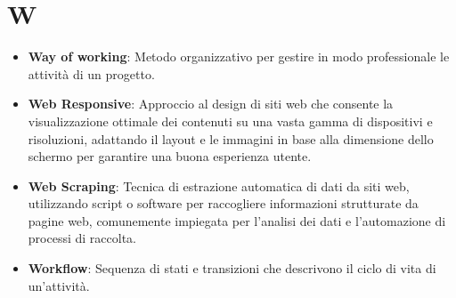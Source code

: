 \section{W}
\begin{itemize}
    \item \textbf{Way of working}: Metodo organizzativo per gestire in modo professionale le attività di un progetto.
    \item \textbf{Web Responsive}: Approccio al design di siti web che consente la visualizzazione ottimale dei contenuti su una vasta gamma di dispositivi e risoluzioni, adattando il layout e le immagini in base alla dimensione dello schermo per garantire una buona esperienza utente.
    \item \textbf{Web Scraping}: Tecnica di estrazione automatica di dati da siti web, utilizzando script o software per raccogliere informazioni strutturate da pagine web, comunemente impiegata per l'analisi dei dati e l'automazione di processi di raccolta.
    \item \textbf{Workflow}: Sequenza di stati e transizioni che descrivono il ciclo di vita di un’attività.
\end{itemize}

